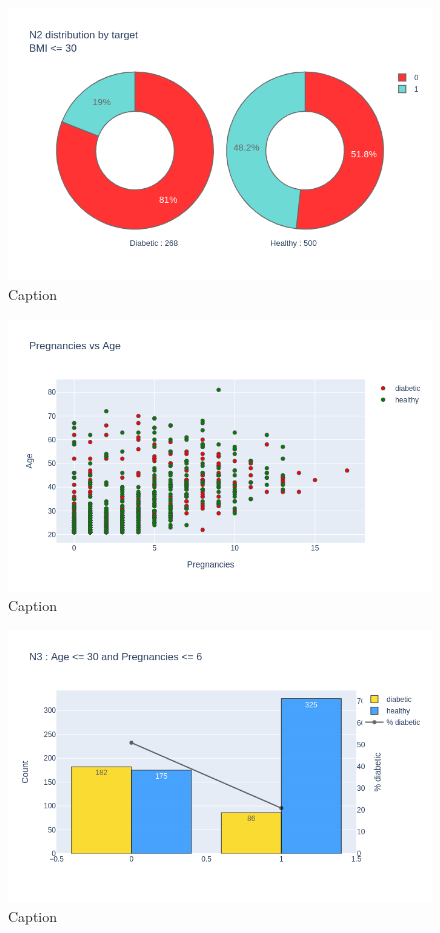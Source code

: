 \documentclass[12pt]{article}
\begin{document}
\begin{figure}[ht]
\centering
\includegraphics[width=1\textwidth]{newplot(16).png}
\caption{\label{fig:26} Caption}
\end{figure}

\begin{figure}[ht]
\centering
\includegraphics[width=1\textwidth]{newplot(17).png}
\caption{\label{fig:27} Caption}
\end{figure}

\begin{figure}[ht]
\centering
\includegraphics[width=1\textwidth]{newplot(18).png}
\caption{\label{fig:28} Caption}
\end{figure}
\end{document}
